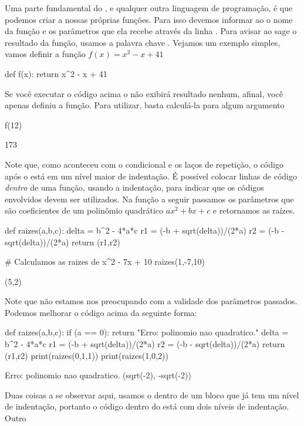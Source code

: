 Uma parte fundamental do \sage, e qualquer outra linguagem de programação,
é que podemos criar a nossas próprias funções. Para isso devemos
informar ao \sage o nome da função e os parâmetros que ela recebe
através da linha . Para
avisar ao sage o resultado da função, usamos a palavra chave .
Vejamos um exemplo simples, vamos definir a função $f(x) = x^2 - x + 41$
\begin{sageinput}
def f(x):
  return x^2 - x + 41
\end{sageinput}
Se você executar o código acima o \sage
não exibirá resultado nenhum, afinal, você apenas
definiu a função. Para utilizar, basta calculá-la 
para algum argumento
\begin{sageinput}
f(12)
\end{sageinput}
\begin{sageoutput}
173
\end{sageoutput}
Note que, como aconteceu com o condicional e os laços de repetição,
o código após o \ils{:} está em um nível maior de indentação. É
possível colocar linhas de código \emph{dentro} de uma função,
usando a indentação, para indicar que os códigos envolvidos devem
ser utilizados. Na função a seguir passamos os parâmetros 
que são coeficientes de um polinômio quadrático $ax^2 + bx + c$ e
retornamos as raízes.
\begin{sageinput}
def raizes(a,b,c): 
  delta = b^2 - 4*a*c 
  r1 = (-b + sqrt(delta))/(2*a) 
  r2 = (-b - sqrt(delta))/(2*a) 
  return (r1,r2) 

# Calculamos as raizes de x^2 - 7x + 10
raizes(1,-7,10)
\end{sageinput}
\begin{sageoutput}
(5,2)
\end{sageoutput}
Note que não estamos nos preocupando com a validade
dos parâmetros passados. Podemos melhorar o código acima
da seguinte forma:
\begin{sageinput}
def raizes(a,b,c):
  if (a == 0):
    return "Erro: polinomio nao quadratico."
  delta = b^2 - 4*a*c 
  r1 = (-b + sqrt(delta))/(2*a) 
  r2 = (-b - sqrt(delta))/(2*a) 
  return (r1,r2) 
print(raizes(0,1,1))
print(raizes(1,0,2))
\end{sageinput}
\begin{sageoutput}
Erro: polinomio nao quadratico.
(sqrt(-2), -sqrt(-2))
\end{sageoutput}
Duas coisas a se observar aqui, usamos o  dentro de um 
bloco que já tem um nível de indentação, portanto o código
dentro do  está com dois níveis de indentação. Outro

